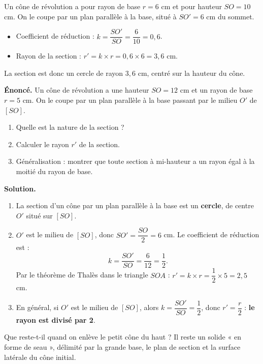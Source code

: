 \documentclass[11pt]{article}
\newcounter{popsec}
\newcounter{popsub}
\newcommand{\courssub}[1]{%
  \stepcounter{popsub}%
  \par\vspace{9pt}\noindent{\popxbold\fontsize{11.5}{13}\selectfont\color{popink}{\color{poporange}\thepopsec.\thepopsub}\hspace{6pt}#1}\par\nopagebreak\vspace{4pt}
}
\begin{document}
\begin{exemplebox}
Un cône de révolution a pour rayon de base $r = 6$ cm et pour hauteur $SO = 10$ cm. On le coupe par un plan parallèle à la base, situé à $SO' = 6$ cm du sommet.
\begin{itemize}
\item Coefficient de réduction : $k = \dfrac{SO'}{SO} = \dfrac{6}{10} = 0,6$.
\item Rayon de la section : $r' = k \times r = 0,6 \times 6 = 3,6$ cm.
\end{itemize}
La section est donc un cercle de rayon $3,6$ cm, centré sur la hauteur du cône.
\end{exemplebox}

\begin{exoresolu}
\textbf{Énoncé.} Un cône de révolution a une hauteur $SO = 12$ cm et un rayon de base $r = 5$ cm. On le coupe par un plan parallèle à la base passant par le milieu $O'$ de $[SO]$.
\begin{enumerate}
\item Quelle est la nature de la section ?
\item Calculer le rayon $r'$ de la section.
\item Généralisation : montrer que toute section à mi-hauteur a un rayon égal à la moitié du rayon de base.
\end{enumerate}
\tcblower
\textbf{Solution.}
\begin{enumerate}
\item La section d'un cône par un plan parallèle à la base est un \textbf{cercle}, de centre $O'$ situé sur $[SO]$.
\item $O'$ est le milieu de $[SO]$, donc $SO' = \dfrac{SO}{2} = 6$ cm. Le coefficient de réduction est :
\[ k = \frac{SO'}{SO} = \frac{6}{12} = \frac{1}{2}. \]
Par le théorème de Thalès dans le triangle $SOA$ : $r' = k \times r = \dfrac{1}{2} \times 5 = 2,5$ cm.
\item En général, si $O'$ est le milieu de $[SO]$, alors $k = \dfrac{SO'}{SO} = \dfrac{1}{2}$, donc $r' = \dfrac{r}{2}$ : \textbf{le rayon est divisé par 2}.
\end{enumerate}
\end{exoresolu}

\courssub{Le tronc de cône}

Que reste-t-il quand on enlève le petit cône du haut ? Il reste un solide « en forme de seau », délimité par la grande base, le plan de section et la surface latérale du cône initial.
\end{document}
